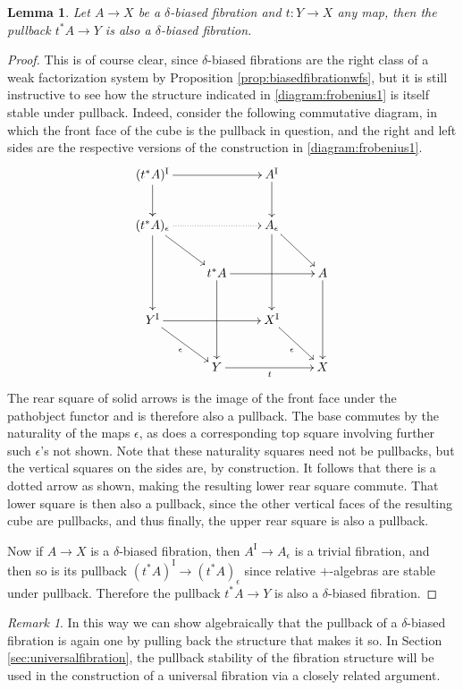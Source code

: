 \documentclass[12pt]{article}
\newcommand{\ra}{\ensuremath{\rightarrow}}
\renewcommand{\to}{\ensuremath{\rightarrow}}
\newcommand{\I}{\ensuremath{\mathrm{I}}}
\newtheorem{lemma}[theorem]{Lemma}
\theoremstyle{remark}
\newtheorem{remark}[theorem]{Remark}
\theoremstyle{definition}
\begin{document}
\begin{lemma}\label{lemma:fibrationspullback}
Let  $A \ra X$ be a $\delta$-biased fibration and $t: Y\ra X$ any map, then the pullback $t^*A \ra Y$ is also a $\delta$-biased  fibration.
\end{lemma}
\begin{proof}
This is of course clear, since $\delta$-biased fibrations are the right class of a weak factorization system by Proposition \ref{prop:biasedfibrationwfs}, but it is still instructive to see how the structure indicated in \eqref{diagram:frobenius1} is itself stable under pullback.  Indeed, consider the following commutative diagram, in which the front face of the cube is the pullback in question, and the right and left sides are the respective versions of the construction in \eqref{diagram:frobenius1}.
%
\begin{equation}\label{diagram:fibrationspullback}
\xymatrix{
 (t^*A)^\I \ar[rr] \ar[d] && A^\I \ar[d] & \\
  (t^*A)_\epsilon \ar[dd] \ar[rd] \ar@{.>}[rr] && A_\epsilon \ar[dd] \ar[rd] & \\
  & t^*A \ar[rr] \ar[dd]  && A \ar[dd]  \\
Y^\I \ar[rd]_\epsilon \ar[rr] & &  X^\I \ar[rd]_\epsilon & \\
 & Y \ar[rr]_t && X 
 }
\end{equation}
%
The rear square of solid arrows is the image of the front face under the pathobject functor and is therefore also a pullback. The base commutes by the naturality of the maps $\epsilon$, as does a corresponding top square involving further such $\epsilon$'s not shown.  Note that these naturality squares need not be pullbacks, but the vertical squares on the sides are, by construction.  It follows that there is a dotted arrow as shown, making the resulting lower rear square commute.  That lower square is then also a pullback, since the other vertical faces of the resulting cube are pullbacks, and thus finally, the upper rear square is also a pullback.  

Now if $A\to X$ is a $\delta$-biased fibration, then $A^\I \to A_\epsilon$ is a trivial fibration, and then so is its pullback $(t^*A)^\I \to (t^*A)_\epsilon$ since relative $+$-algebras are stable under pullback.  Therefore the pullback $t^*A\to Y$ is also a $\delta$-biased fibration.
\end{proof}

\begin{remark}
In this way we can show algebraically that the pullback of a $\delta$-biased fibration is again one by pulling back the structure that makes it so.  In Section \ref{sec:universalfibration}, the pullback stability of the fibration structure will be used in the construction of a universal fibration via a closely related argument.
\end{remark}
\end{document}
